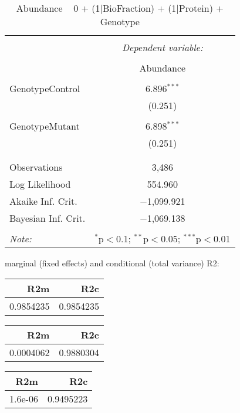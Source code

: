 \documentclass[11pt]{report}
\begin{document}
\begin{table}[!htbp] \centering 
  \caption{Abundance ~ 0 + (1|BioFraction) + (1|Protein) + Genotype} 
  \label{} 
\begin{tabular}{@{\extracolsep{5pt}}lc} 
\\[-1.8ex]\hline 
\hline \\[-1.8ex] 
 & \multicolumn{1}{c}{\textit{Dependent variable:}} \\ 
\cline{2-2} 
\\[-1.8ex] & Abundance \\ 
\hline \\[-1.8ex] 
 GenotypeControl & 6.896$^{***}$ \\ 
  & (0.251) \\ 
  & \\ 
 GenotypeMutant & 6.898$^{***}$ \\ 
  & (0.251) \\ 
  & \\ 
\hline \\[-1.8ex] 
Observations & 3,486 \\ 
Log Likelihood & 554.960 \\ 
Akaike Inf. Crit. & $-$1,099.921 \\ 
Bayesian Inf. Crit. & $-$1,069.138 \\ 
\hline 
\hline \\[-1.8ex] 
\textit{Note:}  & \multicolumn{1}{r}{$^{*}$p$<$0.1; $^{**}$p$<$0.05; $^{***}$p$<$0.01} \\ 
\end{tabular} 
\end{table} 
marginal (fixed effects) and conditional (total variance) R2:

\begin{tabular}{r|r}
\hline
R2m & R2c\\
\hline
0.9854235 & 0.9854235\\
\hline
\end{tabular}

\begin{tabular}{r|r}
\hline
R2m & R2c\\
\hline
0.0004062 & 0.9880304\\
\hline
\end{tabular}

\begin{tabular}{r|r}
\hline
R2m & R2c\\
\hline
1.6e-06 & 0.9495223\\
\hline
\end{tabular}
\end{document}
